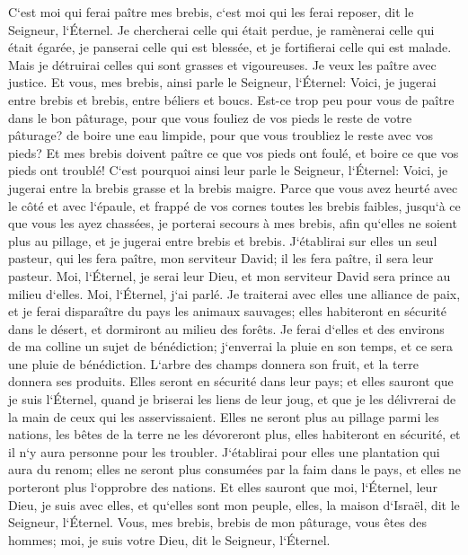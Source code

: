 \verse C`est moi qui ferai paître mes brebis, c`est moi qui les ferai reposer, dit le Seigneur, l`Éternel. 
\verse Je chercherai celle qui était perdue, je ramènerai celle qui était égarée, je panserai celle qui est blessée, et je fortifierai celle qui est malade. Mais je détruirai celles qui sont grasses et vigoureuses. Je veux les paître avec justice. 
\verse Et vous, mes brebis, ainsi parle le Seigneur, l`Éternel: Voici, je jugerai entre brebis et brebis, entre béliers et boucs. 
\verse Est-ce trop peu pour vous de paître dans le bon pâturage, pour que vous fouliez de vos pieds le reste de votre pâturage? de boire une eau limpide, pour que vous troubliez le reste avec vos pieds? 
\verse Et mes brebis doivent paître ce que vos pieds ont foulé, et boire ce que vos pieds ont troublé! 
\verse C`est pourquoi ainsi leur parle le Seigneur, l`Éternel: Voici, je jugerai entre la brebis grasse et la brebis maigre. 
\verse Parce que vous avez heurté avec le côté et avec l`épaule, et frappé de vos cornes toutes les brebis faibles, jusqu`à ce que vous les ayez chassées, 
\verse je porterai secours à mes brebis, afin qu`elles ne soient plus au pillage, et je jugerai entre brebis et brebis. 
\verse J`établirai sur elles un seul pasteur, qui les fera paître, mon serviteur David; il les fera paître, il sera leur pasteur. 
\verse Moi, l`Éternel, je serai leur Dieu, et mon serviteur David sera prince au milieu d`elles. Moi, l`Éternel, j`ai parlé. 
\verse Je traiterai avec elles une alliance de paix, et je ferai disparaître du pays les animaux sauvages; elles habiteront en sécurité dans le désert, et dormiront au milieu des forêts. 
\verse Je ferai d`elles et des environs de ma colline un sujet de bénédiction; j`enverrai la pluie en son temps, et ce sera une pluie de bénédiction. 
\verse L`arbre des champs donnera son fruit, et la terre donnera ses produits. Elles seront en sécurité dans leur pays; et elles sauront que je suis l`Éternel, quand je briserai les liens de leur joug, et que je les délivrerai de la main de ceux qui les asservissaient. 
\verse Elles ne seront plus au pillage parmi les nations, les bêtes de la terre ne les dévoreront plus, elles habiteront en sécurité, et il n`y aura personne pour les troubler. 
\verse J`établirai pour elles une plantation qui aura du renom; elles ne seront plus consumées par la faim dans le pays, et elles ne porteront plus l`opprobre des nations. 
\verse Et elles sauront que moi, l`Éternel, leur Dieu, je suis avec elles, et qu`elles sont mon peuple, elles, la maison d`Israël, dit le Seigneur, l`Éternel. 
\verse Vous, mes brebis, brebis de mon pâturage, vous êtes des hommes; moi, je suis votre Dieu, dit le Seigneur, l`Éternel. 

